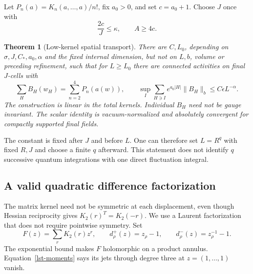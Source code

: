 \documentclass[11pt]{article}
\newtheorem{theorem}{Theorem}[section]
\theoremstyle{remark}
\begin{document}
Let \(P_n(a)=K_n(a,\ldots,a)/n!\), fix \(a_0>0\), and set
\(c=a_0+1\). Choose \(J\) once with
\begin{equation}
 \frac{2c}{J}\le\kappa,\qquad A\ge4c .
 \label{lst-budgets}
\end{equation}

\begin{theorem}[Low-kernel spatial transport]
\label{lst-theorem}
There are \(C,L_0\), depending on
\(\sigma,J,C_*,a_0,\alpha\) and the fixed internal dimension,
but not on \(L,b\), volume or preceding refinement, such that
for \(L\ge L_0\) there are connected activities on final \(J\)-cells
with
\begin{equation}
 \sum_H B_H(w_H)=\sum_{n=2}^4P_n(a(w)),\qquad
 \sup_I\sum_{H\ni I}e^{a_0|H|}\|B_H\|_b
                      \le C\epsilon L^{-\alpha}.
 \label{lst-conclusion}
\end{equation}
The construction is linear in the total kernels.
Individual \(B_H\) need not be gauge invariant.
The scalar identity is vacuum-normalized and absolutely
convergent for compactly supported final fields.
\end{theorem}

The constant is fixed after \(J\) and before \(L\).
One can therefore set \(L=R^q\) with fixed \(R,J\) and
choose a finite \(q\) afterward. This statement does not
identify \(q\) successive quantum integrations with one
direct fluctuation integral.

\subsection{A valid quadratic difference factorization}
\label{lst-quadratic-section}

The matrix kernel need not be symmetric at each displacement,
even though Hessian reciprocity gives
\(K_2(r)^T=K_2(-r)\). We use a Laurent factorization that
does not require pointwise symmetry. Set
\[
 F(z)=\sum_r K_2(r)z^r,\qquad
 d_\rho^+(z)=z_\rho-1,\qquad
 d_\rho^-(z)=z_\rho^{-1}-1 .
\]
The exponential bound makes \(F\) holomorphic on a product
annulus. Equation~\eqref{lst-moments} says its jets through
degree three at \(z=(1,\ldots,1)\) vanish.
\end{document}
